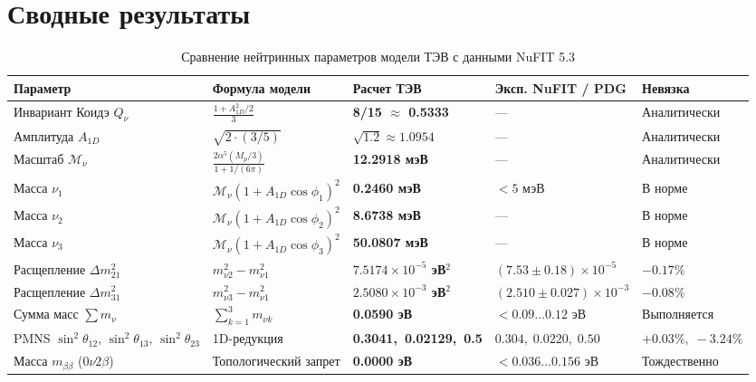 \documentclass[11pt,a4paper]{article}
\theoremstyle{definition}
\theoremstyle{remark}
\begin{document}
\section{Сводные результаты}
\begin{table}[htbp]
\centering
\small
\setlength{\tabcolsep}{3.5pt}
\caption{Сравнение нейтринных параметров модели ТЭВ с данными NuFIT 5.3}
\label{tab:neutrino_summary}
\vspace{2mm}
\begin{tabularx}{\textwidth}{>{\raggedright\arraybackslash}p{2.8cm} >{\centering\arraybackslash}X >{\centering\arraybackslash}p{2.3cm} >{\centering\arraybackslash}X >{\centering\arraybackslash}p{2.1cm}}
\toprule
\textbf{Параметр} & \textbf{Формула модели} & \textbf{Расчет ТЭВ} & \textbf{Эксп. NuFIT / PDG} & \textbf{Невязка} \\
\midrule
Инвариант Коидэ $Q_\nu$ & $\frac{1 + A_{1D}^2/2}{3}$ & \textbf{8/15 $\approx$ 0.5333} & --- & Аналитически \\
\addlinespace[1mm]
Амплитуда $A_{1D}$ & $\sqrt{2 \cdot (3/5)}$ & \textbf{$\sqrt{1.2} \approx 1.0954$} & --- & Аналитически \\
\addlinespace[1mm]
Масштаб $\mathcal{M}_\nu$ & $\frac{2\alpha^5(M_p/3)}{1 + 1/(6\pi)}$ & \textbf{12.2918 мэВ} & --- & Аналитически \\
\addlinespace[1mm]
Масса $\nu_1$ & $\mathcal{M}_\nu (1 + A_{1D}\cos\phi_1)^2$ & \textbf{0.2460 мэВ} & $< 5$ мэВ & В норме \\
\addlinespace[1mm]
Масса $\nu_2$ & $\mathcal{M}_\nu (1 + A_{1D}\cos\phi_2)^2$ & \textbf{8.6738 мэВ} & --- & В норме \\
\addlinespace[1mm]
Масса $\nu_3$ & $\mathcal{M}_\nu (1 + A_{1D}\cos\phi_3)^2$ & \textbf{50.0807 мэВ} & --- & В норме \\
\addlinespace[1mm]
Расщепление $\Delta m_{21}^2$ & $m_{\nu 2}^2 - m_{\nu 1}^2$ & \textbf{$7.5174 \times 10^{-5}$ эВ$^2$} & $(7.53 \pm 0.18)\times 10^{-5}$ & $-0.17\%$ \\
\addlinespace[1mm]
Расщепление $\Delta m_{31}^2$ & $m_{\nu 3}^2 - m_{\nu 1}^2$ & \textbf{$2.5080 \times 10^{-3}$ эВ$^2$} & $(2.510 \pm 0.027)\times 10^{-3}$ & $-0.08\%$ \\
\addlinespace[1mm]
Сумма масс $\sum m_\nu$ & $\sum_{k=1}^3 m_{\nu k}$ & \textbf{0.0590 эВ} & $< 0.09\dots 0.12$ эВ & Выполняется \\
\addlinespace[1mm]
PMNS $\sin^2\theta_{12},\,\sin^2\theta_{13},\,\sin^2\theta_{23}$ & 1D-редукция & \textbf{0.3041,\ 0.02129,\ 0.5} & $0.304,\;0.0220,\;0.50$ & $+0.03\%,\;-3.24\%$ \\
\addlinespace[1mm]
Масса $m_{\beta\beta}$ ($0\nu 2\beta$) & Топологический запрет & \textbf{0.0000 эВ} & $< 0.036\dots 0.156$ эВ & Тождественно \\
\bottomrule
\end{tabularx}
\end{table}
\end{document}
